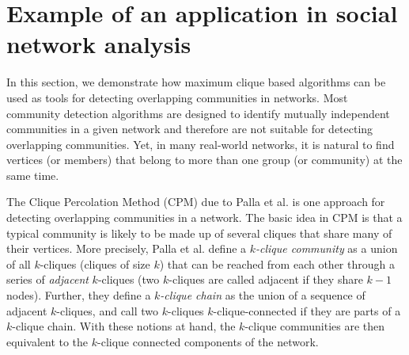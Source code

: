\section{Example of an application in social network analysis}
\label{sec:applications}

In this section, we demonstrate how maximum clique based algorithms can be used as  tools for  
detecting overlapping communities in networks. 
Most community detection algorithms are designed to identify mutually independent communities 
in a given network and therefore are not suitable for detecting overlapping communities.
Yet, in many real-world networks, it is natural to find vertices (or members) that belong to more than 
one group (or community) at the same time.


The Clique Percolation Method (CPM) due to Palla et al. \cite{cite-key} is one approach for detecting overlapping communities in a network. The basic idea in CPM is that a typical community is likely to be made up of several cliques that share many of their vertices. More precisely, Palla et al. define
a {\em $k$-clique community} as a union of all $k$-cliques (cliques of size $k$) that can be reached from each other through a series of {\em adjacent} $k$-cliques 
(two $k$-cliques are called adjacent if they share $k - 1$ nodes). 
Further, they define a {\em $k$-clique chain} as the union of a sequence of adjacent $k$-cliques, and
call two $k$-cliques $k$-clique-connected if they are parts of a $k$-clique chain. With these notions at hand, the $k$-clique communities are then equivalent to the $k$-clique connected components
of the network. 

